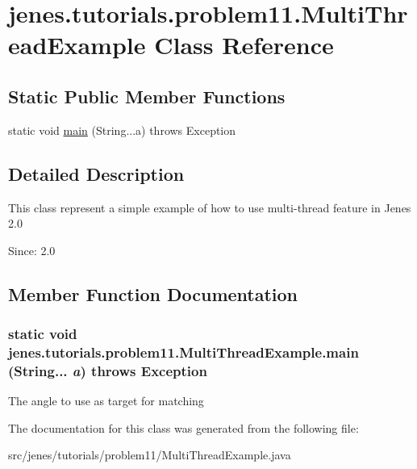 \hypertarget{classjenes_1_1tutorials_1_1problem11_1_1_multi_thread_example}{
\section{jenes.tutorials.problem11.MultiThreadExample Class Reference}
\label{classjenes_1_1tutorials_1_1problem11_1_1_multi_thread_example}
}
\subsection*{Static Public Member Functions}
\begin{CompactItemize}
\item 
static void \hyperlink{classjenes_1_1tutorials_1_1problem11_1_1_multi_thread_example_78352360229430486f32eb26551cb118}{main} (String...a)  throws Exception
\end{CompactItemize}


\subsection{Detailed Description}
This class represent a simple example of how to use multi-thread feature in Jenes 2.0

\begin{Desc}
\item[Since:]2.0 \end{Desc}


\subsection{Member Function Documentation}
\hypertarget{classjenes_1_1tutorials_1_1problem11_1_1_multi_thread_example_78352360229430486f32eb26551cb118}{
\subsubsection[main]{\setlength{\rightskip}{0pt plus 5cm}static void jenes.tutorials.problem11.MultiThreadExample.main (String... {\em a})  throws Exception}}
\label{classjenes_1_1tutorials_1_1problem11_1_1_multi_thread_example_78352360229430486f32eb26551cb118}




The angle to use as target for matching 

The documentation for this class was generated from the following file:\begin{CompactItemize}
\item 
src/jenes/tutorials/problem11/MultiThreadExample.java\end{CompactItemize}
